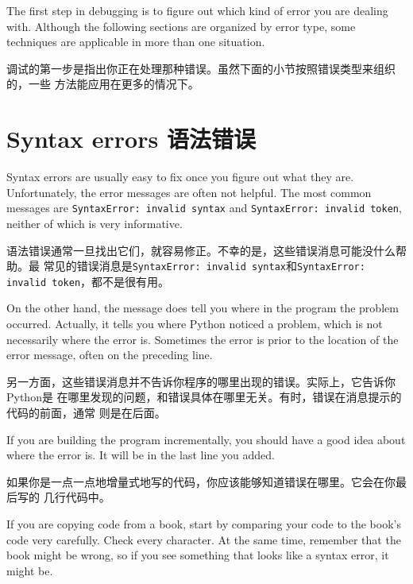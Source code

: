 \documentclass[10pt]{book}
\begin{document}
\begin{CJK}{UTF8}{gbsn}
\begin{itemize}
\end{itemize}

The first step in debugging is to figure out which kind of
error you are dealing with.  Although the following sections are
organized by error type, some techniques are
applicable in more than one situation.

调试的第一步是指出你正在处理那种错误。虽然下面的小节按照错误类型来组织的，一些
方法能应用在更多的情况下。

\section{Syntax errors 语法错误}

Syntax errors are usually easy to fix once you figure out what they
are.  Unfortunately, the error messages are often not helpful.
The most common messages are {\tt SyntaxError: invalid syntax} and
{\tt SyntaxError: invalid token}, neither of which is very informative.

语法错误通常一旦找出它们，就容易修正。不幸的是，这些错误消息可能没什么帮助。最
常见的错误消息是{\tt SyntaxError: invalid syntax}和{\tt SyntaxError: invalid
token}，都不是很有用。

On the other hand, the message does tell you where in the program the
problem occurred.  Actually, it tells you where Python
noticed a problem, which is not necessarily where the error
is.  Sometimes the error is prior to the location of the error
message, often on the preceding line.

另一方面，这些错误消息并不告诉你程序的哪里出现的错误。实际上，它告诉你Python是
在哪里发现的问题，和错误具体在哪里无关。有时，错误在消息提示的代码的前面，通常
则是在后面。

If you are building the program incrementally, you should have
a good idea about where the error is.  It will be in the last
line you added.

如果你是一点一点地增量式地写的代码，你应该能够知道错误在哪里。它会在你最后写的
几行代码中。

If you are copying code from a book, start by comparing
your code to the book's code very carefully.  Check every character.
At the same time, remember that the book might be wrong, so
if you see something that looks like a syntax error, it might be.


\end{CJK}
\end{document}
